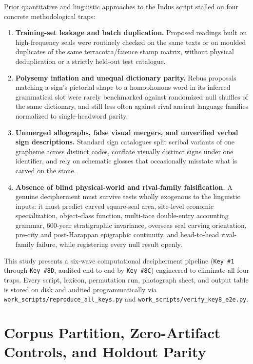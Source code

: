 \documentclass[11pt,a4paper]{article}
\begin{document}
Prior quantitative and linguistic approaches to the Indus script \citep{fairservis1992,parpola1994} stalled on four concrete methodological traps:
\begin{enumerate}
  \item \textbf{Training-set leakage and batch duplication.} Proposed readings built on high-frequency seals were routinely checked on the same texts or on moulded duplicates of the same terracotta/faience stamp matrix, without physical deduplication or a strictly held-out test catalogue.
  \item \textbf{Polysemy inflation and unequal dictionary parity.} Rebus proposals matching a sign's pictorial shape to a homophonous word in its inferred grammatical slot were rarely benchmarked against randomized null shuffles of the same dictionary, and still less often against rival ancient language families normalized to single-headword parity.
  \item \textbf{Unmerged allographs, false visual mergers, and unverified verbal sign descriptions.} Standard sign catalogues \citep{mahadevan1977,joshi1987cisi,wells2015} split scribal variants of one grapheme across distinct codes, conflate visually distinct signs under one identifier, and rely on schematic glosses that occasionally misstate what is carved on the stone.
  \item \textbf{Absence of blind physical-world and rival-family falsification.} A genuine decipherment must survive tests wholly exogenous to the linguistic inputs: it must predict carved square-seal area, site-level economic specialization, object-class function, multi-face double-entry accounting grammar, 600-year stratigraphic invariance, overseas seal carving orientation, pre-city and post-Harappan epigraphic continuity, and head-to-head rival-family failure, while registering every null result openly.
\end{enumerate}

This study presents a six-wave computational decipherment pipeline (\texttt{Key \#1} through \texttt{Key \#8D}, audited end-to-end by \texttt{Key \#8C}) engineered to eliminate all four traps. Every script, lexicon, permutation run, photograph sheet, and output table is stored on disk and audited programmatically via \texttt{work\_scripts/reproduce\_all\_keys.py} and \texttt{work\_scripts/verify\_key8\_e2e.py}.

\section{Corpus Partition, Zero-Artifact Controls, and Holdout Parity}
\end{document}
